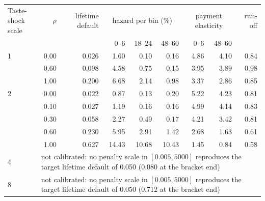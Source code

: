 \begin{tabular}{lrrrrrrrr}
\toprule
Taste-shock scale & $\rho$ & lifetime default & \multicolumn{3}{c}{hazard per bin (\%)} & \multicolumn{2}{c}{payment elasticity} & run-off \\
 & & & 0--6 & 18--24 & 48--60 & 0--6 & 48--60 & \\
\midrule
1 & 0.00 & 0.026 & 1.60 & 0.10 & 0.16 & 4.86 & 4.10 & 0.84 \\
 & 0.60 & 0.098 & 4.58 & 0.75 & 0.15 & 3.95 & 3.89 & 0.98 \\
 & 1.00 & 0.200 & 6.68 & 2.14 & 0.98 & 3.37 & 2.86 & 0.85 \\
2 & 0.00 & 0.022 & 0.87 & 0.13 & 0.20 & 5.22 & 4.23 & 0.81 \\
 & 0.10 & 0.027 & 1.19 & 0.16 & 0.16 & 4.99 & 4.14 & 0.83 \\
 & 0.30 & 0.058 & 2.27 & 0.49 & 0.17 & 4.21 & 3.42 & 0.81 \\
 & 0.60 & 0.230 & 5.95 & 2.91 & 1.42 & 2.68 & 1.63 & 0.61 \\
 & 1.00 & 0.627 & 14.43 & 10.68 & 10.43 & 1.45 & 0.84 & 0.58 \\
4 & \multicolumn{8}{l}{not calibrated: no penalty scale in $[0.005, 5000]$ reproduces the target lifetime default of 0.050 (0.080 at the bracket end)} \\
8 & \multicolumn{8}{l}{not calibrated: no penalty scale in $[0.005, 5000]$ reproduces the target lifetime default of 0.050 (0.712 at the bracket end)} \\
\bottomrule
\end{tabular}
